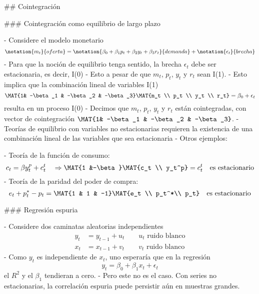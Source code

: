 



## Cointegración




### Cointegración como equilibrio de largo plazo

- Considere el modelo monetario
\begin{equation*}
\notation{m_t}{oferta} = \notation{\beta_0 + \beta_1p_t+\beta_2y_t+\beta_3r_t}{demanda} + \notation{\epsilon_t}{brecha}
\end{equation*}
- Para que la noción de equilibrio tenga sentido, la brecha $\epsilon_{t}$ debe ser estacionaria, es decir, I(0)
- Esto a pesar de que $m_t$, $p_t$, $y_t$ y $r_t$ sean I(1).
- Esto implica que la combinación lineal de variables I(1)
\begin{equation*}
\MAT{1& -\beta_1 & -\beta_2 & -\beta_3}\MAT{m_t \\ p_t \\ y_t \\ r_t} = \beta_0+\epsilon_{t}
\end{equation*}
resulta en un proceso I(0)
- Decimos que $m_t$, $p_t$, $y_t$ y $r_t$ están cointegradas, con vector de cointegración $\MAT{1& -\beta_1 & -\beta_2 & -\beta_3}$.
- \alert{Teorías de equilibrio con variables no estacionarias requieren la existencia de una combinación lineal de las variables que sea estacionaria}
- Otros ejemplos:

    - Teoría de la función de consumo:
    \begin{equation*}
    c_t = \beta y_t^p + c_t^t \quad\Rightarrow \MAT{1 &-\beta}\MAT{c_t \\ y_t^p} = c_t^t \quad\text{es estacionario}
    \end{equation*}
    - Teoría de la paridad del poder de compra:
    \begin{equation*}
    e_t + p_t^* - p_t = \MAT{1 & 1 & -1}\MAT{e_t \\ p_t^*\\ p_t} \quad\text{es estacionario}
    \end{equation*}




### Regresión espuria

- Considere dos caminatas aleatorias independientes
\begin{align*}
y_t &= y_{t-1} + u_t \qquad u_t \text{ ruido blanco}\\
x_t &= x_{t-1} + v_t \qquad v_t \text{ ruido blanco}
\end{align*}
- Como $y_t$ es independiente de $x_t$, uno esperaría que en la regresión
\begin{equation*}
y_t = \beta_0 + \beta_1 x_t + \epsilon_t
\end{equation*}
el $R^2$ y el $\beta_1$ tendieran a cero.
- Pero este no es el caso. Con series no estacionarias, \alert{la correlación espuria puede persistir aún en muestras grandes}.




